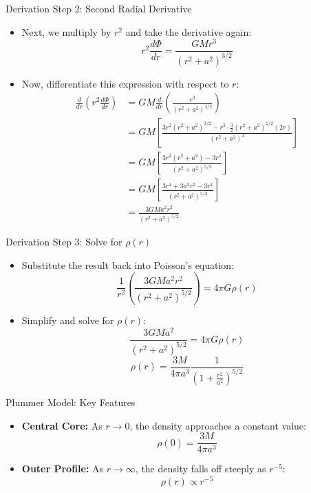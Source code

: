 \documentclass{beamer}
\begin{document}
\begin{frame}{Derivation Step 2: Second Radial Derivative}
    \begin{itemize}
        \item Next, we multiply by $r^2$ and take the derivative again:
        $$ r^2 \frac{d\Phi}{dr} = \frac{GMr^3}{(r^2 + a^2)^{3/2}} $$
        \item Now, differentiate this expression with respect to $r$:
        \begin{align*} \frac{d}{dr} \left( r^2 \frac{d\Phi}{dr} \right) &= GM \frac{d}{dr} \left( \frac{r^3}{(r^2 + a^2)^{3/2}} \right) \\ &= GM \left[ \frac{3r^2(r^2 + a^2)^{3/2} - r^3 \cdot \frac{3}{2}(r^2 + a^2)^{1/2}(2r)}{(r^2 + a^2)^3} \right] \\ &= GM \left[ \frac{3r^2(r^2 + a^2) - 3r^4}{(r^2 + a^2)^{5/2}} \right] \\ &= GM \left[ \frac{3r^4 + 3a^2r^2 - 3r^4}{(r^2 + a^2)^{5/2}} \right] \\ &= \frac{3GMa^2r^2}{(r^2 + a^2)^{5/2}} \end{align*}
    \end{itemize}
\end{frame}

\begin{frame}{Derivation Step 3: Solve for $\rho(r)$}
    \begin{itemize}
        \item Substitute the result back into Poisson's equation:
        $$ \frac{1}{r^2} \left( \frac{3GMa^2r^2}{(r^2 + a^2)^{5/2}} \right) = 4 \pi G \rho(r) $$
        \item Simplify and solve for $\rho(r)$:
        $$ \frac{3GMa^2}{(r^2 + a^2)^{5/2}} = 4 \pi G \rho(r) $$
        $$ \rho(r) = \frac{3M}{4\pi a^3} \frac{1}{\left(1 + \frac{r^2}{a^2}\right)^{5/2}} $$
    \end{itemize}
\end{frame}

\begin{frame}{Plummer Model: Key Features}
    \begin{itemize}
        \item \textbf{Central Core:} As $r \to 0$, the density approaches a constant value:
        $$ \rho(0) = \frac{3M}{4\pi a^3} $$
        \item \textbf{Outer Profile:} As $r \to \infty$, the density falls off steeply as $r^{-5}$:
        $$ \rho(r) \propto r^{-5} $$
    \end{itemize}
    \cite{king1966}
\end{frame}
\end{document}
